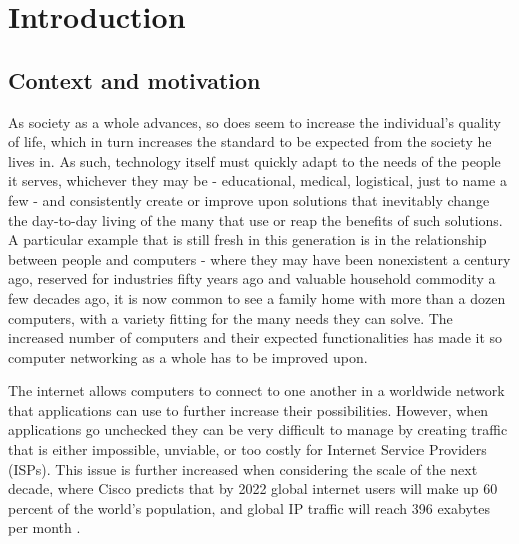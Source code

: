 \documentclass[
  oneside,
  11pt, a4paper,
  footinclude=true,
  headinclude=true,
  cleardoublepage=empty
]{scrbook}
\begin{document}
	\tableofcontents
	\listoffigures
	\listoftables
	\printglossary[type=\acronymtype]
	\clearpage
	\thispagestyle{empty}
	
	
	\chapter{Introduction}
    \section{Context and motivation}
    
    As society as a whole advances, so does seem to increase the individual's quality of life, which in turn increases the standard to be expected from the society he lives in. As such, technology itself must quickly adapt to the needs of the people it serves, whichever they may be - educational, medical, logistical, just to name a few - and consistently create or improve upon solutions that inevitably change the day-to-day living of the many that use or reap the benefits of such solutions. A particular example that is still fresh in this generation is in the relationship between people and computers - where they may have been nonexistent a century ago, reserved for industries fifty years ago and valuable household commodity a few decades ago, it is now common to see a family home with more than a dozen computers, with a variety fitting for the many needs they can solve. The increased number of computers and their expected functionalities has made it so computer networking as a whole has to be improved upon. 
    
    The internet allows computers to connect to one another in a worldwide network that applications can use to further increase their possibilities. However, when applications go unchecked they can be very difficult to manage by creating traffic that is either impossible, unviable, or too costly for Internet Service Providers (ISPs). This issue is further increased when considering the scale of the next decade, where Cisco predicts that by 2022 global internet users will make up 60 percent of the world’s population, and global IP traffic will reach 396 exabytes per month \cite{cisco}.
    
\end{document}
